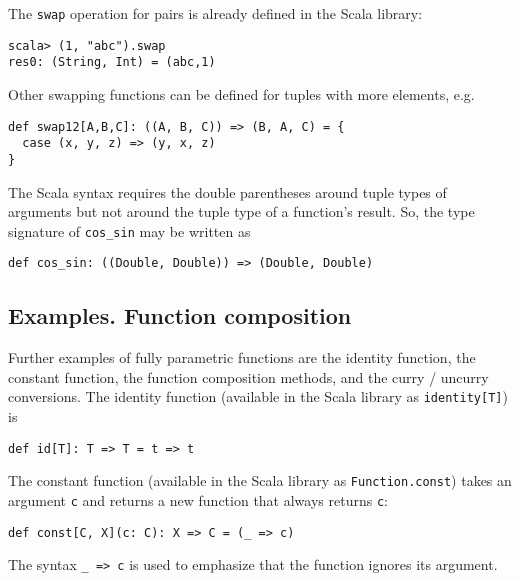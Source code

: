 The \lstinline!swap! operation
for pairs is already defined in the Scala library:
\begin{lstlisting}
scala> (1, "abc").swap
res0: (String, Int) = (abc,1)
\end{lstlisting}
Other swapping functions can be defined for tuples with more elements,
e.g.
\begin{lstlisting}
def swap12[A,B,C]: ((A, B, C)) => (B, A, C) = {
  case (x, y, z) => (y, x, z)
}
\end{lstlisting}
The Scala syntax requires the double parentheses around tuple types
of arguments but not around the tuple type of a function's result.
So, the type signature of \lstinline!cos_sin!
may be written as
\begin{lstlisting}
def cos_sin: ((Double, Double)) => (Double, Double)
\end{lstlisting}

\subsection{Examples. Function composition\label{subsec:Examples-of-fully-parametric}}

Further examples of fully parametric functions are the identity function,
the constant function, the function composition methods, and the curry
/ uncurry conversions. The identity function
(available in the Scala library as \lstinline!identity[T]!)
is
\begin{lstlisting}
def id[T]: T => T = t => t
\end{lstlisting}
The constant function (available in the
Scala library as \lstinline!Function.const!)
takes an argument \lstinline!c!
and returns a new function that always returns \lstinline!c!:
\begin{lstlisting}
def const[C, X](c: C): X => C = (_ => c)
\end{lstlisting}
The syntax \lstinline!_ => c!
is used to emphasize that the function ignores its argument.

